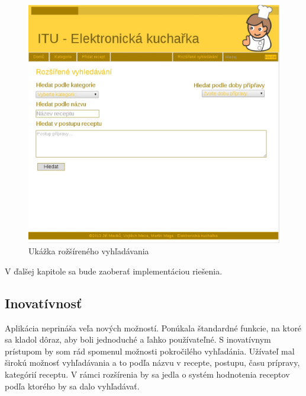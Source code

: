\documentclass[12pt,a4paper,titlepage,final]{article}
\begin{document}
\begin{figure}
\begin{center}

\includegraphics[scale=0.6]{img/extendedsearch.eps} 
\caption{Ukážka rožšíreného vyhľadávania}
\label{rozVyhledavani}

\end{center}

\end{figure}


 V ďalšej kapitole sa bude zaoberať implementáciou riešenia. 

\subsection{Inovatívnosť}
Aplikácia neprináša veľa nových možností. Ponúkala štandardné funkcie, na ktoré sa kladol dôraz, aby boli jednoduché a ľahko používateľné. S inovatívnym prístupom by som rád spomenul možnosti pokročilého vyhľadánia. Užívateľ mal širokú možnosť vyhľadávania a to podľa názvu v recepte, postupu, času prípravy, kategórií receptu. V rámci rozšírenia by sa jedla o systém hodnotenia receptov podľa ktorého by sa dalo vyhľadávať.
\end{document}
